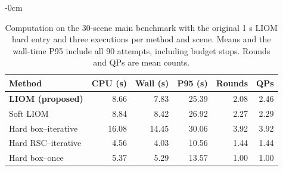 \begin{table}[htbp]
\begin{adjustwidth}{-\extralength}{0cm}
\caption{Computation on the 30-scene main benchmark with the original 1 s LIOM hard entry and three executions per method and scene. Means and the wall-time P95 include all 90 attempts, including budget stops. Rounds and QPs are mean counts.\label{tab:main-new}}
\centering\small
\begin{tabular}{lrrrrr}\toprule
Method & CPU (s) & Wall (s) & P95 (s) & Rounds & QPs\\\midrule
\textbf{LIOM (proposed)} & 8.66 & 7.83 & 25.39 & 2.08 & 2.46\\
Soft LIOM & 8.84 & 8.42 & 26.92 & 2.27 & 2.29\\
Hard box--iterative & 16.08 & 14.45 & 30.06 & 3.92 & 3.92\\
Hard RSC--iterative & 4.56 & 4.03 & 10.56 & 1.44 & 1.44\\
Hard box--once & 5.37 & 5.29 & 13.57 & 1.00 & 1.00\\
\bottomrule\end{tabular}
\end{adjustwidth}
\end{table}

